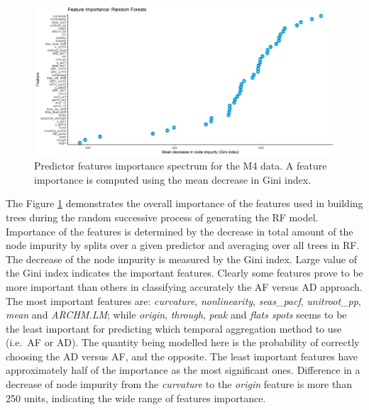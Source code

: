 \documentclass[preprint, 3p,
authoryear]{elsarticle} %
\begin{document}
\begin{figure}[H]

{\centering \includegraphics[width=0.95\linewidth]{img/Fig_importance} 

}

\caption{Predictor features importance spectrum for the M4 data. A feature importance is computed using the mean decrease in Gini index.}\label{fig:RFpartial}
\end{figure}

The Figure \ref{fig:RFpartial} demonstrates the overall importance of
the features used in building trees during the random successive process
of generating the RF model. Importance of the features is determined by
the decrease in total amount of the node impurity by splits over a given
predictor and averaging over all trees in RF. The decrease of the node
impurity is measured by the Gini index. Large value of the Gini index
indicates the important features. Clearly some features prove to be more
important than others in classifying accurately the AF versus AD
approach. The most important features are: \emph{curvature},
\emph{nonlinearity}, \emph{seas\_pacf}, \emph{unitroot\_pp}, \emph{mean}
and \emph{ARCHM.LM}; while \emph{origin}, \emph{through}, \emph{peak}
and \emph{flats spots} seems to be the least important for predicting
which temporal aggregation method to use (i.e.~AF or AD). The quantity
being modelled here is the probability of correctly choosing the AD
versus AF, and the opposite. The least important features have
approximately half of the importance as the most significant ones.
Difference in a decrease of node impurity from the \emph{curvature} to
the \emph{origin} feature is more than 250 units, indicating the wide
range of features importance.
\end{document}
